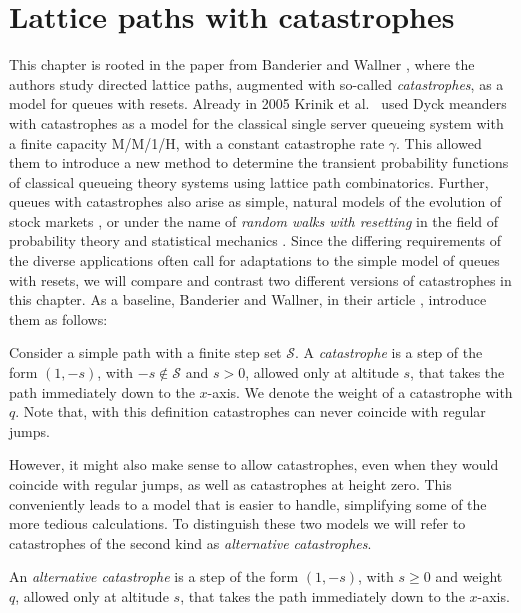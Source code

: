 
\chapter{Lattice paths with catastrophes}
\label{chapter:catastrophes}

This chapter is rooted in the paper from Banderier and Wallner \cite{Catastrophes}, where the authors study directed lattice paths, augmented with so-called \textit{catastrophes}, as a model for queues with resets.
Already in 2005 Krinik et al.~\cite{QueueingTheory} used Dyck meanders with catastrophes as a model for the classical single server queueing system with a finite capacity M/M/1/H, with a constant catastrophe rate $\gamma$. This allowed them to introduce a new method to determine the transient probability functions of classical queueing theory systems
using lattice path combinatorics.
Further, queues with catastrophes also arise as simple, natural models of the evolution of stock markets \cite{Schoutens}, or under the name of \textit{random walks with resetting} in the field of probability theory and statistical mechanics \cite{RandomWalksResetting}.
Since the differing requirements of the diverse applications often call for
adaptations to the simple model of queues with resets, we will compare and contrast two different versions of catastrophes in this chapter. 
As a baseline, Banderier and Wallner, in their article \cite{Catastrophes}, introduce them as follows:

\begin{definition}[Catastrophe]
  Consider a simple path with a finite step set $\mathcal{S}$. A \textit{catastrophe} is a step of the form $(1, -s)$, with $-s \notin \mathcal{S}$ and $s > 0$, allowed only at altitude $s$, that takes the path immediately down to the $x$-axis. We denote the weight of a catastrophe with $q$. Note that, with this definition catastrophes can never coincide with regular jumps.
\end{definition}

However, it might also make sense to allow catastrophes, even when they would coincide with regular jumps, as well as catastrophes at height zero.
This conveniently leads to a model that is easier to handle, simplifying some of the more tedious calculations. To distinguish these two models we will refer to catastrophes of the second kind as \textit{alternative catastrophes}.

\begin{definition}
  An \textit{alternative catastrophe} is a step of the form $(1, -s)$, with $s \geq 0$ and weight $q$, allowed only at altitude $s$, that takes the path immediately down to the $x$-axis.
\end{definition}

